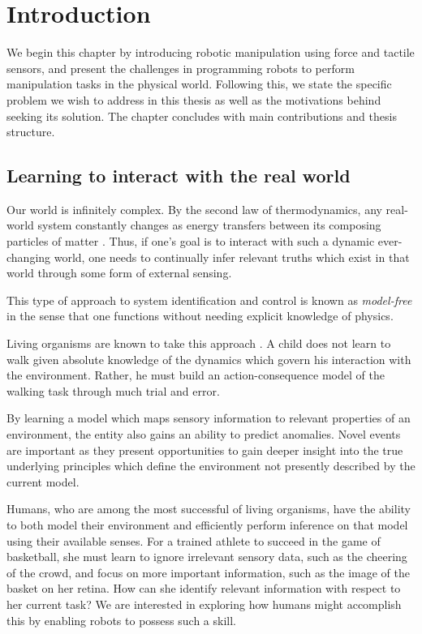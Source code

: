 \chapter{Introduction}
\label{chp:intro}

We begin this chapter by introducing robotic manipulation using force and tactile sensors, and present the challenges in programming robots to perform manipulation tasks in the physical world.
Following this, we state the specific problem we wish to address in this thesis as well as the motivations behind seeking its solution.
The chapter concludes with main contributions and thesis structure.


\section{Learning to interact with the real world}

Our world is infinitely complex.
By the second law of thermodynamics, any real-world system constantly changes as energy transfers between its composing particles of matter \cite{zubarev1974nonequilibrium}. 
Thus, if one's goal is to interact with such a dynamic ever-changing world, one needs to continually infer relevant truths which exist in that world through some form of external sensing.

This type of approach to system identification and control is known as \emph{model-free} \cite{Spall1998} in the sense that one functions without needing explicit knowledge of physics.

Living organisms are known to take this approach \cite{dayan2008decision}. %
A child does not learn to walk given absolute knowledge of the dynamics which govern his interaction with the environment. Rather, he must build an action-consequence model of the walking task through much trial and error.

By learning a model which maps sensory information to relevant properties of an environment, the entity also gains an ability to predict anomalies.
Novel events are important as they present opportunities to gain deeper insight into the true underlying principles which define the environment not presently described by the current model.

Humans, who are among the most successful of living organisms, have the ability to both model their environment and efficiently perform inference on that model using their available senses.
For a trained athlete to succeed in the game of basketball, she must learn to ignore irrelevant sensory data, such as the cheering of the crowd, and focus on more important information, such as the image of the basket on her retina.
How can she identify relevant information with respect to her current task?
We are interested in exploring how humans might accomplish this by enabling robots to possess such a skill.

